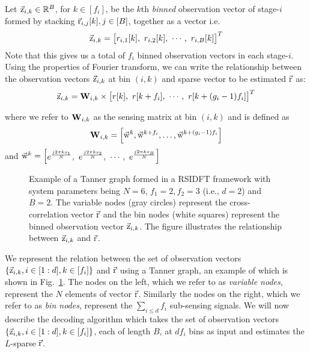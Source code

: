 	 Let $\vec{\mathrm{z}}_{i,k}\in\mathbb{R}^{B}$, for $k\in [f_i]$, be the $k$th \textit{binned} observation vector of stage-$i$ formed by stacking $\vec{\mathrm{r}}_{i,j}[k], j\in[B]$, together as a vector i.e.
\[
	  \vec{\mathrm{z}}_{i,k} = \begin{bmatrix}
	 r_{i,1}[k],~ 
	 r_{i,2}[k],~ 
	 \cdots,~
	 r_{i,B}[k]
	 \end{bmatrix}^{T}
\]
Note that this gives us a total of $f_i$ binned observation vectors in each stage-$i$. Using the properties of Fourier transform, we can write the relationship between the observation vectors $\vec{\mathrm{z}}_{i,k}$ at bin $(i,k)$ and sparse vector to be estimated $\vec{\mathrm{r}}$ as: 
\begin{align}
	\label{Eqn:Generator Equation}
	\vec{\mathrm{z}}_{i,k}= \mathbf{W}_{i,k} \times
	\begin{bmatrix}
		r[k],~
		r[k+f_i],~
		\cdots,~
		r[k+(g_i-1)f_i]
	\end{bmatrix}^{T}
\end{align}

where we refer to $\mathbf{W}_{i,k}$ as the sensing matrix at bin $(i,k)$ and is defined as
\begin{align}\label{Eqn:Sensing Matrix}
	\mathbf{W}_{i,k} = \left[\vec{\mathrm{w}}^{k},\vec{\mathrm{w}}^{k+f_i},\ldots, \vec{\mathrm{w}}^{k+(g_i-1)f_i}\right]
\end{align} and
 $\vec{\mathrm{w}}^{k}=
	\begin{bmatrix}
		e^{\frac{j2\pi ks_1}{N}}, ~
		e^{\frac{j2\pi ks_2}{N}},~
		\cdots,~
		e^{\frac{j2\pi ks_B}{N}}
	\end{bmatrix}$

\begin{figure}[h!]
	\begin{center}
	 	\resizebox{0.40\textwidth}{!}{}	
	\end{center}	
	\caption{Example of a Tanner graph formed in a RSIDFT framework with system parameters being $N=6$, $f_1=2, f_2=3$ (i.e., $d=2$) and $B=2$. The variable nodes (gray circles) represent the cross-correlation vector $\vec{\mathrm{r}}$ and the bin nodes (white squares) represent the binned observation vector $\vec{\mathrm{z}}_{i,k}$. The figure illustrates the relationship between $\vec{\mathrm{z}}_{i,k}$ and $\vec{\mathrm{r}}$.}\label{fig:factorgraph}
	\vspace{5 pt}
\end{figure}
 
We represent the relation between the set of observation vectors $\{\vec{\mathrm{z}}_{i,k},i\in[1:d],k\in[f_i]\}$ and $\vec{\mathrm{r}}$ using a Tanner graph, an example of which is shown in Fig.~\ref{fig:factorgraph}. The nodes on the left, which we refer to as {\it variable nodes}, represent the $N$ elements of vector $\vec{\mathrm{r}}$. Similarly the nodes on the right, which we refer to as {\it bin nodes}, represent the $\sum_{i\leq d} f_i$ sub-sensing signals. We will now describe the decoding algorithm which takes the set of observation vectors $\{\vec{\mathrm{z}}_{i,k},i\in[1:d],k\in[f_i]\}$, each of length $B$, at $df_i$ bins as input and estimates the $L$-sparse $\vec{\mathrm{r}}$.	


